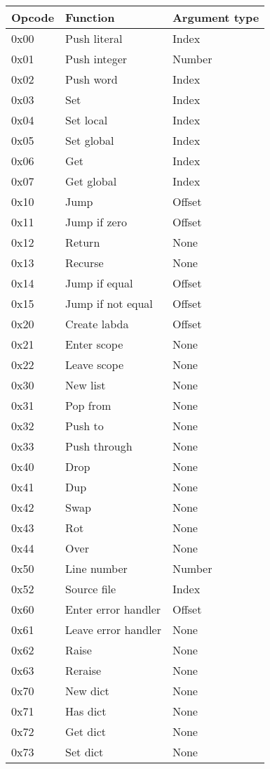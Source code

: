 \begin{tabular}{|l|l|l|}
\hline
\bfseries{Opcode} & \bfseries{Function} & \bfseries{Argument type} \\ \hline
0x00 & Push literal & Index \\ \hline
0x01 & Push integer & Number \\ \hline
0x02 & Push word & Index \\ \hline
0x03 & Set & Index \\ \hline
0x04 & Set local & Index \\ \hline
0x05 & Set global & Index \\ \hline
0x06 & Get & Index \\ \hline
0x07 & Get global & Index \\ \hline
0x10 & Jump & Offset \\ \hline
0x11 & Jump if zero & Offset \\ \hline
0x12 & Return & None \\ \hline
0x13 & Recurse & None \\ \hline
0x14 & Jump if equal & Offset \\ \hline
0x15 & Jump if not equal & Offset \\ \hline
0x20 & Create labda & Offset \\ \hline
0x21 & Enter scope & None \\ \hline
0x22 & Leave scope & None \\ \hline
0x30 & New list & None \\ \hline
0x31 & Pop from & None \\ \hline
0x32 & Push to & None \\ \hline
0x33 & Push through & None \\ \hline
0x40 & Drop & None \\ \hline
0x41 & Dup & None \\ \hline
0x42 & Swap & None \\ \hline
0x43 & Rot & None \\ \hline
0x44 & Over & None \\ \hline
0x50 & Line number & Number \\ \hline
0x52 & Source file & Index \\ \hline
0x60 & Enter error handler & Offset \\ \hline
0x61 & Leave error handler & None \\ \hline
0x62 & Raise & None \\ \hline
0x63 & Reraise & None \\ \hline
0x70 & New dict & None \\ \hline
0x71 & Has dict & None \\ \hline
0x72 & Get dict & None \\ \hline
0x73 & Set dict & None \\ \hline
\end{tabular}

